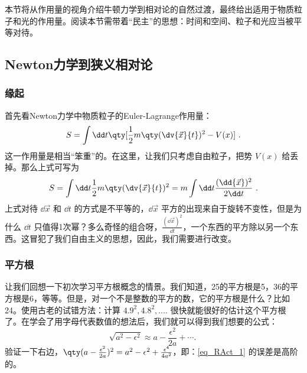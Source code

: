 
本节将从作用量的视角介绍牛顿力学到相对论的自然过渡，最终给出适用于物质粒子和光的作用量。阅读本节需带着“民主”的思想：时间和空间、粒子和光应当被平等对待。
\subsection{Newton力学到狭义相对论}
\subsubsection{缘起}
首先看Newton力学中物质粒子的Euler-Lagrange作用量：
\begin{equation}\label{eq_RAct_5}
S=\int\dd t\qty[\frac{1}{2}m\qty(\dv{\vec x}{t})^2-V(x)]~.
\end{equation}
这一作用量是相当“笨重”的。在这里，让我们只考虑自由粒子，把势 $V(x)$ 给丢掉。那么上式可写为
\begin{equation}\label{eq_RAct_2}
S=\int\dd t\frac{1}{2}m\qty(\dv{\vec x}{t})^2=m\int\dd t\frac{(\dd{\vec x})^2}{2\dd t}~.
\end{equation}
上式对待 $\dd{\vec x}$ 和 $\dd t$ 的方式是不平等的，$\dd{\vec x}$ 平方的出现来自于旋转不变性，但是为什么 $\dd t$ 只值得1次幂？多么奇怪的组合呀，$\frac{(\dd{\vec x})^2}{\dd t}$，一个东西的平方除以另一个东西。这冒犯了我们自由主义的思想，因此，我们需要进行改变。

\subsubsection{平方根}
让我们回想一下初次学习平方根概念的情景。我们知道，25的平方根是5，36的平方根是6，等等。但是，对一个不是整数的平方的数，它的平方根是什么？比如24。使用古老的试错方法：计算 $4.9^2,4.8^2,\ldots.$ 很快就能很好的估计这个平方根了。在学会了用字母代表数值的想法后，我们就可以得到我们想要的公式：
\begin{equation}\label{eq_RAct_1}
\sqrt{a^2-\epsilon^2}\approx a-\frac{\epsilon^2}{2a}+\cdots.~
\end{equation}
验证一下右边，$\qty(a-\frac{\epsilon^2}{2a})^2=a^2-\epsilon^2+\frac{\epsilon^4}{4a^2}$，即：\autoref{eq_RAct_1} 的误差是高阶的。


